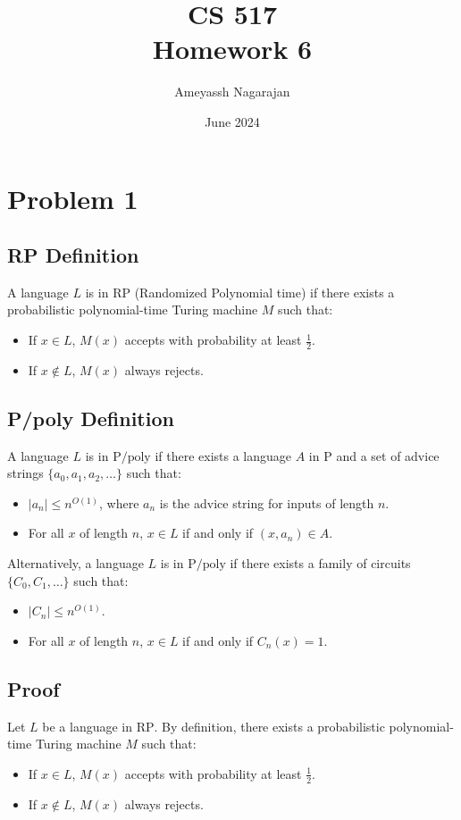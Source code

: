 \documentclass{article}
\title{CS 517 \\ Homework 6}
\author{Ameyassh Nagarajan}
\date{June 2024}
\begin{document}
\maketitle
\section{Problem 1}

\subsection*{RP Definition}
A language \(L\) is in \(\text{RP}\) (Randomized Polynomial time) if there exists a probabilistic polynomial-time Turing machine \(M\) such that:
\begin{itemize}
    \item If \(x \in L\), \(M(x)\) accepts with probability at least \(\frac{1}{2}\).
    \item If \(x \notin L\), \(M(x)\) always rejects.
\end{itemize}

\subsection*{P/poly Definition}
A language \(L\) is in \(\text{P/poly}\) if there exists a language \(A\) in \(\text{P}\) and a set of advice strings \(\{a_0, a_1, a_2, \ldots\}\) such that:
\begin{itemize}
    \item \(|a_n| \leq n^{O(1)}\), where \(a_n\) is the advice string for inputs of length \(n\).
    \item For all \(x\) of length \(n\), \(x \in L\) if and only if \((x, a_n) \in A\).
\end{itemize}

Alternatively, a language \(L\) is in \(\text{P/poly}\) if there exists a family of circuits \(\{C_0, C_1, \ldots\}\) such that:
\begin{itemize}
    \item \(|C_n| \leq n^{O(1)}\).
    \item For all \(x\) of length \(n\), \(x \in L\) if and only if \(C_n(x) = 1\).
\end{itemize}

\subsection{Proof}
Let \(L\) be a language in \(\text{RP}\). By definition, there exists a probabilistic polynomial-time Turing machine \(M\) such that:
\begin{itemize}
    \item If \(x \in L\), \(M(x)\) accepts with probability at least \(\frac{1}{2}\).
    \item If \(x \notin L\), \(M(x)\) always rejects.
\end{itemize}
\end{document}
